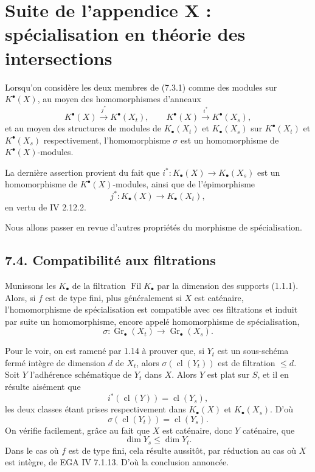 \documentclass[11pt]{article}
\newcommand{\Gr}{\operatorname{Gr}}
\newcommand{\cl}{\operatorname{cl}}
\providecommand{\Gr}{\operatorname{Gr}}
\providecommand{\Gr}{\operatorname{G}}
\begin{document}
\section*{Suite de l'appendice X : spécialisation en théorie des intersections}

Lorsqu'on considère les deux membres de (7.3.1) comme des modules sur \(K^\bullet(X)\), au moyen des homomorphismes d'anneaux
\[
  K^\bullet(X)\xrightarrow{j^*}K^\bullet(X_t),\qquad
  K^\bullet(X)\xrightarrow{i^*}K^\bullet(X_s),
\]
et au moyen des structures de modules de \(K_\bullet(X_t)\) et \(K_\bullet(X_s)\) sur \(K^\bullet(X_t)\) et \(K^\bullet(X_s)\) respectivement, l'homomorphisme \(\sigma\) est un homomorphisme de \(K^\bullet(X)\)-modules.

La dernière assertion provient du fait que \(i^*:K_\bullet(X)\to K_\bullet(X_s)\) est un homomorphisme de \(K^\bullet(X)\)-modules, ainsi que de l'épimorphisme
\[
  j^*:K_\bullet(X)\longrightarrow K_\bullet(X_t),
\]
en vertu de IV 2.12.2.

Nous allons passer en revue d'autres propriétés du morphisme de spécialisation.

\subsection*{7.4. Compatibilité aux filtrations}
Munissons les \(K_\bullet\) de la filtration \(\operatorname{Fil}K_\bullet\) par la dimension des supports (1.1.1). Alors, si \(f\) est de type fini, plus généralement si \(X\) est caténaire, l'homomorphisme de spécialisation est compatible avec ces filtrations et induit par suite un homomorphisme, encore appelé homomorphisme de spécialisation,
\begin{equation}\tag{7.4.1}
  \sigma:\Gr_\bullet(X_t)\longrightarrow \Gr_\bullet(X_s).
\end{equation}

Pour le voir, on est ramené par 1.14 à prouver que, si \(Y_t\) est un sous-schéma fermé intègre de dimension \(d\) de \(X_t\), alors \(\sigma(\cl(Y_t))\) est de filtration \(\leq d\). Soit \(Y\) l'adhérence schématique de \(Y_t\) dans \(X\). Alors \(Y\) est plat sur \(S\), et il en résulte aisément que
\[
  i^*(\cl(Y))=\cl(Y_s),
\]
les deux classes étant prises respectivement dans \(K_\bullet(X)\) et \(K_\bullet(X_s)\). D'où
\[
  \sigma(\cl(Y_t))=\cl(Y_s).
\]
On vérifie facilement, grâce au fait que \(X\) est caténaire, donc \(Y\) caténaire, que
\[
  \dim Y_s\leq \dim Y_t .
\]
Dans le cas où \(f\) est de type fini, cela résulte aussitôt, par réduction au cas où \(X\) est intègre, de EGA IV 7.1.13. D'où la conclusion annoncée.
\end{document}
